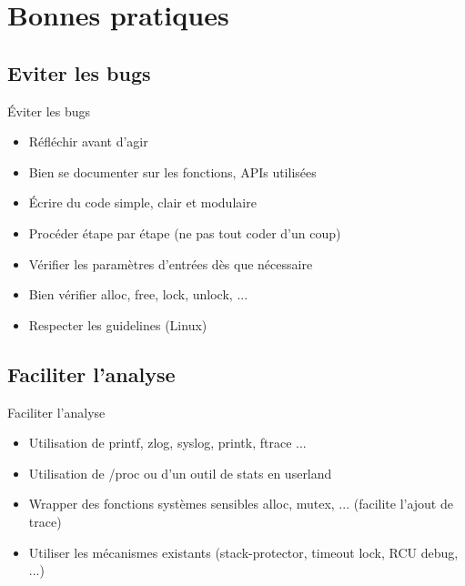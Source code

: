 \section{Bonnes pratiques}

\subsection{Eviter les bugs}
\begin{frame}{Éviter les bugs}
	\begin{itemize}
	 	\item
			Réfléchir avant d'agir
		\item
			Bien se documenter sur les fonctions, APIs utilisées
		\item
			Écrire du code simple, clair et modulaire
	 	\item
			Procéder étape par étape (ne pas tout coder d'un coup)			
	 	\item
			Vérifier les paramètres d'entrées dès que nécessaire
	 	\item
			Bien vérifier alloc, free, lock, unlock, ...
	 	\item
			Respecter les guidelines (Linux)
	\end{itemize}
\end{frame}

\subsection{Faciliter l'analyse}
\begin{frame}{Faciliter l'analyse}
	\begin{itemize}
	 	\item
			Utilisation de printf, zlog, syslog, printk, ftrace ...
		\item
			Utilisation de /proc ou d'un outil de stats en userland
		\item
			Wrapper des fonctions systèmes sensibles alloc, mutex, ... (facilite l'ajout de trace)
		\item
			Utiliser les mécanismes existants (stack-protector, timeout lock, RCU debug, ...)
	\end{itemize}
\end{frame}
